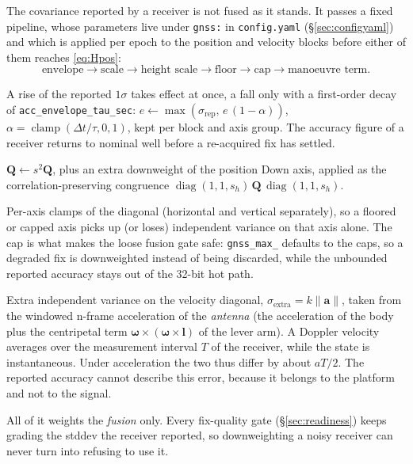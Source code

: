 \documentclass[11pt,a4paper]{article}
\newcommand{\vect}[1]{\bm{#1}}
\newcommand{\mat}[1]{\bm{#1}}
\newcommand{\dt}{\Delta t}
\newcommand{\diag}{\operatorname{diag}}
\newcommand{\code}[1]{\texttt{#1}}
\begin{document}
The covariance reported by a receiver is not fused as it stands. It passes a
fixed pipeline, whose parameters live under \code{gnss:} in \code{config.yaml}
(\S\ref{sec:configyaml}) and which is applied per epoch to the position and
velocity blocks before either of them reaches \eqref{eq:Hpos}:
\begin{equation}
  \text{envelope} \rightarrow \text{scale} \rightarrow
  \text{height scale} \rightarrow \text{floor} \rightarrow \text{cap}
  \rightarrow \text{manoeuvre term} .
\end{equation}
\begin{description}\setlength\itemsep{0pt}
  \item[Envelope.] A rise of the reported $1\sigma$ takes effect at once, a
    fall only with a first-order decay of \code{acc\_\allowbreak{}envelope\_\allowbreak{}tau\_\allowbreak{}sec}:
    $e \leftarrow \max(\sigma_{\text{rep}},\, e\,(1-\alpha))$,
    $\alpha = \operatorname{clamp}(\dt/\tau, 0, 1)$, kept per block and axis
    group. The accuracy figure of a receiver returns to nominal well before a
    re-acquired fix has settled.
  \item[Scale and height scale.] $\mat{Q} \leftarrow s^2\mat{Q}$, plus an extra
    downweight of the position Down axis, applied as the correlation-preserving
    congruence $\diag(1,1,s_h)\,\mat{Q}\,\diag(1,1,s_h)$.
  \item[Floor and cap.] Per-axis clamps of the diagonal (horizontal and vertical
    separately), so a floored or capped axis picks up (or loses) independent
    variance on that axis alone. The cap is what makes the loose fusion gate
    safe: \code{gnss\_\allowbreak{}max\_\allowbreak*} defaults to the caps, so a degraded fix is
    downweighted instead of being discarded, while the unbounded reported accuracy
    stays out of the 32-bit hot path.
  \item[Manoeuvre term.] Extra independent variance on the velocity diagonal,
    $\sigma_{\text{extra}} = k \lVert \vect{a} \rVert$, taken from the windowed
    n-frame acceleration of the \emph{antenna} (the acceleration of the body plus
    the centripetal term $\vect{\omega}\times(\vect{\omega}\times\vect{l})$ of the
    lever arm). A Doppler velocity averages over the measurement
    interval $T$ of the receiver, while the state is instantaneous. Under
    acceleration the two thus differ by about $aT/2$. The reported accuracy
    cannot describe this error, because it belongs to the platform and not to the
    signal.
\end{description}
All of it weights the \emph{fusion} only. Every fix-quality gate
(\S\ref{sec:readiness}) keeps grading the stddev the receiver reported, so
downweighting a noisy receiver can never turn into refusing to use it.
\end{document}
